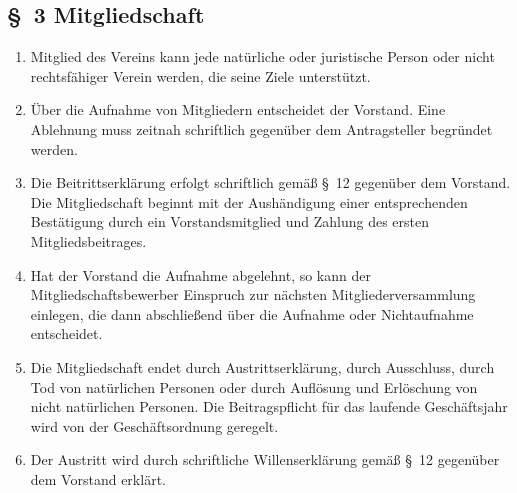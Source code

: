 \documentclass[10pt,a4paper]{scrartcl}
\begin{document}
\subsection*{\S \ 3 Mitgliedschaft}
\begin{enumerate}
	\item Mitglied des Vereins kann jede nat{\"u}rliche oder juristische Person oder
		nicht rechts\-f{\"a}higer Verein werden, die seine Ziele unterst{\"u}tzt.
        \item {\"U}ber die Aufnahme von Mitgliedern entscheidet der Vorstand. Eine Ablehnung muss zeitnah schriftlich gegen{\"u}ber dem Antragsteller begr{\"u}ndet werden.
	\item Die Beitrittserkl{\"a}rung erfolgt schriftlich gem{\"a}{\ss} \S \ 12 gegen{\"u}ber dem Vorstand. Die
		Mitgliedschaft beginnt mit der Aush{\"a}ndigung einer entsprechenden Best{\"a}tigung durch
                ein Vorstandsmitglied und Zahlung des ersten Mitgliedsbeitrages.
	\item Hat der Vorstand die Aufnahme abgelehnt, so kann der Mitgliedschaftsbewerber Einspruch
		zur n{\"a}chsten Mitgliederversammlung einlegen, die dann abschlie{\ss}end {\"u}ber die Aufnahme
		oder Nichtaufnahme entscheidet.
	\item Die Mitgliedschaft endet durch Austrittserkl{\"a}rung, durch Ausschluss, durch Tod von
		nat{\"u}r\-li\-chen Personen oder durch Aufl{\"o}sung und Erl{\"o}schung von nicht
		nat{\"u}r\-lichen Personen.
		Die Beitragspflicht f{\"u}r das laufende Gesch{\"a}ftsjahr wird von der Gesch{\"a}ftsordnung
		geregelt.
	\item Der Austritt wird durch schriftliche Willenserkl{\"a}rung gem{\"a}{\ss} \S \ 12 gegen{\"u}ber dem Vorstand
		erkl{\"a}rt.
\end{enumerate}
%
%
\end{document}
